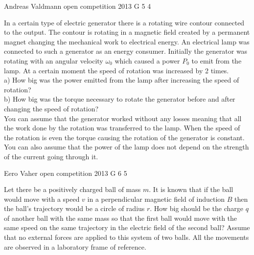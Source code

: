 \documentclass[11pt]{article}
\begin{document}
{Andreas Valdmann} %
{open competition} %
{2013} %
{G 5} %
{4} %
{

\ifEngStatement
In a certain type of electric generator there is a rotating wire contour connected to the output. The contour is rotating in a magnetic field created by a permanent magnet changing the mechanical work to electrical energy. An electrical lamp was connected to such a generator as an energy consumer. Initially the generator was rotating with an angular velocity $\omega_0$ which caused a power $P_0$ to emit from the lamp. At a certain moment the speed of rotation was increased by 2 times.\\
a) How big was the power emitted from the lamp after increasing the speed of rotation?\\
b) How big was the torque necessary to rotate the generator before and after changing the speed of rotation?\\
You can assume that the generator worked without any losses meaning that all the work done by the rotation was transferred to the lamp. When the speed of the rotation is even the torque causing the rotation of the generator is constant. You can also assume that the power of the lamp does not depend on the strength of the current going through it.
\fi
}

{Eero Vaher} %
{open competition} %
{2013} %
{G 6} %
{5} %
{

\ifEngStatement
Let there be a positively charged ball of mass $m$. It is known that if the ball would move with a speed $v$ in a perpendicular magnetic field of induction $B$ then the ball’s trajectory would be a circle of radius $r$. How big should be the charge $q$ of another ball with the same mass so that the first ball would move with the same speed on the same trajectory in the electric field of the second ball? Assume that no external forces are applied to this system of two balls. All the movements are observed in a laboratory frame of reference.
\fi
}
\end{document}
